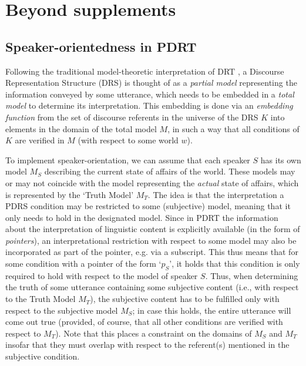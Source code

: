 \section{Beyond supplements}

\subsection{Speaker-orientedness in PDRT}

Following the traditional model-theoretic interpretation of DRT \citep[see,
e.g.][]{kamp1981theory,kamp1993discourse,kamp2011discourse}, a Discourse
Representation Structure (DRS) is thought of as a \textit{partial model}
representing the information conveyed by some utterance, which needs to be
embedded in a \textit{total model} to determine its interpretation. This
embedding is done via an \textit{embedding function} from the set of
discourse referents in the universe of the DRS $K$ into elements in the
domain of the total model $M$, in such a way that all conditions of $K$ are
verified in $M$ (with respect to some world $w$).

To implement speaker-orientation, we can assume that each speaker $S$ has
its own model $M_S$ describing the current state of affairs of the world.
These models may or may not coincide with the model representing the
\textit{actual} state of affairs, which is represented by the `Truth Model'
$M_T$. The idea is that the interpretation a PDRS condition may be
restricted to some (subjective) model, meaning that it only needs to hold in
the designated model. Since in PDRT the information about the interpretation
of linguistic content is explicitly available (in the form of
\textit{pointers}), an interpretational restriction with respect to some
model may also be incorporated as part of the pointer, e.g. via a subscript.
This thus means that for some condition with a pointer of the form `$p_S$',
it holds that this condition is only required to hold with respect to the
model of speaker $S$. Thus, when determining the truth of some utterance
containing some subjective content (i.e., with respect to the Truth Model
$M_T$), the subjective content has to be fulfilled only with respect to the
subjective model $M_S$; in case this holds, the entire utterance will come
out true (provided, of course, that all other conditions are verified with
respect to $M_T$). Note that this places a constraint on the domains of
$M_S$ and $M_T$ insofar that they must overlap with respect to the
referent(s) mentioned in the subjective condition.

